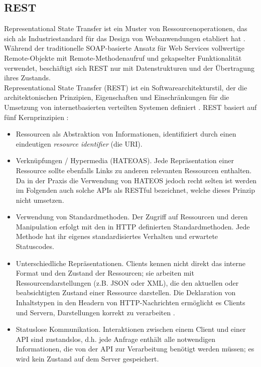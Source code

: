 \subsection{REST}

Representational State Transfer ist ein Muster von Ressourcenoperationen, das sich als Industriestandard für das Design von Webanwendungen etabliert hat \parencite[2]{battle2008bridging}. Während der traditionelle SOAP-basierte Ansatz für Web Services vollwertige Remote-Objekte mit Remote-Methodenaufruf und gekapselter Funktionalität verwendet, beschäftigt sich REST nur mit Datenstrukturen und der Übertragung ihres Zustands. \\

Representational State Transfer (REST) ist ein Softwarearchitekturstil, der die architektonischen Prinzipien, Eigenschaften und Einschränkungen für die Umsetzung von internetbasierten verteilten Systemen definiert \parencite[86]{fielding2000architectural}. REST basiert auf fünf Kernprinzipien \parencite[11]{tilkov2015rest}:

\begin{itemize}
	\item Ressourcen als Abstraktion von Informationen, identifiziert durch einen eindeutigen \emph{resource identifier} (die URI).
	\item Verknüpfungen / Hypermedia (HATEOAS). Jede Repräsentation einer Ressource sollte ebenfalls Links zu anderen relevanten Ressourcen enthalten. Da in der Praxis die Verwendung von HATEOS jedoch recht selten ist \parencite[35--36]{rodriguez2016rest} werden im Folgenden auch solche APIs als RESTful bezeichnet, welche dieses Prinzip nicht umsetzen.
	\item Verwendung von Standardmethoden. Der Zugriff auf Ressourcen und deren Manipulation erfolgt mit den in HTTP definierten Standardmethoden. Jede Methode hat ihr eigenes standardisiertes Verhalten und erwartete Statuscodes.
	\item Unterschiedliche Repräsentationen. Clients kennen nicht direkt das interne Format und den Zustand der Ressourcen; sie arbeiten mit Ressourcendarstellungen (z.B. JSON oder XML), die den aktuellen oder beabsichtigten Zustand einer Ressource darstellen. Die Deklaration von Inhaltstypen in den Headern von HTTP-Nachrichten ermöglicht es Clients und Servern, Darstellungen korrekt zu verarbeiten \parencite[23]{rodriguez2016rest}.
	\item Statuslose Kommunikation. Interaktionen zwischen einem Client und einer API sind zustandslos, d.h. jede Anfrage enthält alle notwendigen Informationen, die von der API zur Verarbeitung benötigt werden müssen; es wird kein Zustand auf dem Server gespeichert.
\end{itemize}

